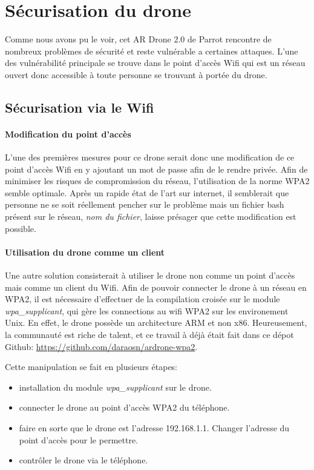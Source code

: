 \section{Sécurisation du drone}
Comme nous avons pu le voir, cet AR Drone 2.0 de Parrot rencontre de nombreux problèmes de sécurité et reste vulnérable a certaines attaques. L'une des vulnérabilité principale se trouve dans le point d'accès Wifi qui est un réseau ouvert donc accessible à toute personne se trouvant à portée du drone.

\subsection{Sécurisation via le Wifi}
\paragraph{Modification du point d'accès}
L'une des premières mesures pour ce drone serait donc une modification de ce point d'accès Wifi en y ajoutant un mot de passe afin de le rendre privée. Afin de minimiser les risques de compromission du réseau, l'utilisation de la norme WPA2 semble optimale. Après un rapide état de l'art sur internet, il semblerait que personne ne se soit réellement pencher sur le problème mais un fichier bash présent sur le réseau, \textit{nom du fichier}, laisse présager que cette modification est possible.

\paragraph{Utilisation du drone comme un client}
Une autre solution consisterait à utiliser le drone non comme un point d'accès mais comme un client du Wifi.
Afin de pouvoir connecter le drone à un réseau en WPA2, il est nécessaire d'effectuer de la compilation croisée sur le module \textit{wpa\_supplicant}, qui gère les connections au wifi WPA2 sur les environement Unix. En effet, le drone possède un architecture ARM et non x86. Heureusement, la communauté est riche de talent, et ce travail à déjà était fait dans ce dépot Github: \url{https://github.com/daraosn/ardrone-wpa2}.

Cette manipulation se fait en plusieurs étapes:
\begin{itemize}
  \item installation du module \textit{wpa\_supplicant} sur le drone.
  \item connecter le drone au point d'accès WPA2 du téléphone.
  \item faire en sorte que le drone est l'adresse 192.168.1.1. Changer l'adresse du point d'accès pour le permettre.
  \item contrôler le drone via le téléphone.
\end{itemize}

